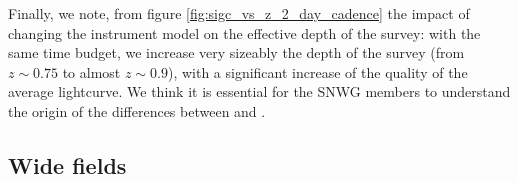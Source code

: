 \documentclass[\docopts]{\docclass}
\begin{document}
Finally, we note, from figure \ref{fig:sigc_vs_z_2_day_cadence} the
impact of changing the instrument model on the effective depth of the
survey: with the same time budget, we increase very sizeably the depth
of the survey (from $z \sim 0.75$ to almost $z\sim 0.9$), with a
significant increase of the quality of the average lightcurve.  We
think it is essential for the SNWG members to understand the origin of
the differences between \cite{LSE-40} and \cite{SMTN-002}.




\subsection{Wide fields}

\begin{figure}
\begin{center}

\end{center}
\end{figure}
\end{document}
